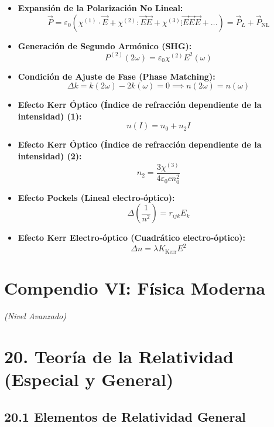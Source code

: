 \documentclass[11pt,a4paper]{article}
\begin{document}
\begin{itemize}
  \item \textbf{Expansión de la Polarización No Lineal:}
  \[
    \vec{P} = \varepsilon_0 \left( \chi^{(1)} \cdot \vec{E} + \chi^{(2)} : \vec{E} \vec{E} + \chi^{(3)} \vdots \vec{E} \vec{E} \vec{E} + \dots \right) = \vec{P}_L + \vec{P}_{\mathrm{NL}}
  \]
  \item \textbf{Generación de Segundo Armónico (SHG):}
  \[
    P^{(2)}(2\omega) = \varepsilon_0 \chi^{(2)} E^2(\omega)
  \]
  \item \textbf{Condición de Ajuste de Fase (Phase Matching):}
  \[
    \Delta k = k(2\omega) - 2k(\omega) = 0 \implies n(2\omega) = n(\omega)
  \]
  \item \textbf{Efecto Kerr Óptico (Índice de refracción dependiente de la intensidad) (1):}
  \[
    n(I) = n_0 + n_2 I
  \]
  \item \textbf{Efecto Kerr Óptico (Índice de refracción dependiente de la intensidad) (2):}
  \[
    n_2 = \frac{3 \chi^{(3)}}{4 \varepsilon_0 c n_0^2}
  \]
  \item \textbf{Efecto Pockels (Lineal electro-óptico):}
  \[
    \Delta\left(\frac{1}{n^2}\right) = r_{ijk} E_k
  \]
  \item \textbf{Efecto Kerr Electro-óptico (Cuadrático electro-óptico):}
  \[
    \Delta n = \lambda K_{\text{Kerr}} E^2
  \]
\end{itemize}

\section*{Compendio VI: Física Moderna}

\textit{(Nivel Avanzado)}

\section*{20. Teoría de la Relatividad (Especial y General)}

\subsection*{20.1 Elementos de Relatividad General}
\end{document}
